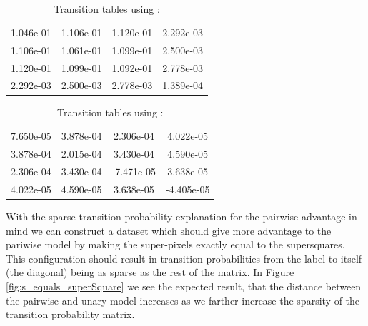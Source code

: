 \begin{table}
\caption{ Transition tables using : }
\label{table:neigh2}
\centering
\begin{tabular}{ c c c c}
  1.046e-01 & 1.106e-01 & 1.120e-01 & 2.292e-03 \\
  1.106e-01 & 1.061e-01 & 1.099e-01 & 2.500e-03 \\
  1.120e-01 & 1.099e-01 & 1.092e-01 & 2.778e-03 \\
  2.292e-03 & 2.500e-03 & 2.778e-03 & 1.389e-04 \\
\end{tabular}
\bigskip
{} 
\begin{tabular}{ c c c c}
  7.650e-05 & 3.878e-04 & 2.306e-04 & 4.022e-05 \\
  3.878e-04 & 2.015e-04 & 3.430e-04 & 4.590e-05 \\
  2.306e-04 & 3.430e-04 & -7.471e-05 & 3.638e-05 \\
  4.022e-05 & 4.590e-05 & 3.638e-05 & -4.405e-05 \\
\end{tabular}

\end{table} 
With the sparse transition probability explanation for the pairwise advantage in mind we can construct a dataset which should give more advantage to the pariwise model by making the super-pixels exactly equal to the supersquares. This configuration should result in transition probabilities from the label to itself (the diagonal) being as sparse as the rest of the matrix. In Figure \ref{fig:s_equals_superSquare} we see the expected result, that the distance between the pairwise and unary model increases as we farther increase the sparsity of the transition probability matrix. 


